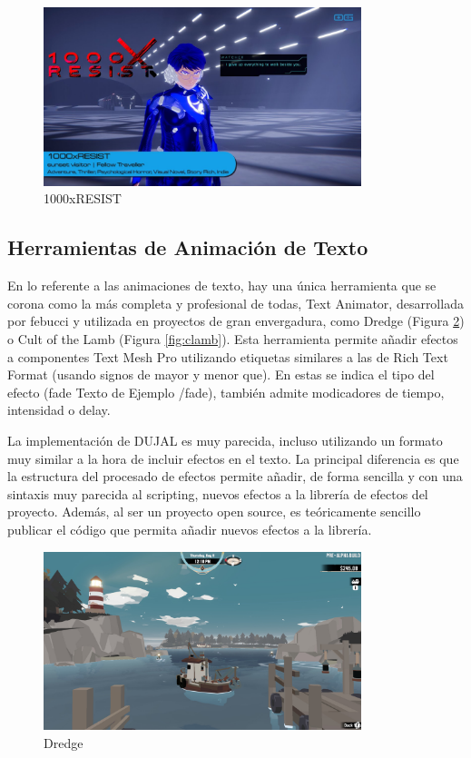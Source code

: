 \begin{figure}[H]
  \centering
  \includegraphics[width=350px,clip=true]{100xresist.png}
  \caption{1000xRESIST}
  \label{fig:1000xResist}
\end{figure}

 \subsection{Herramientas de Animación de Texto}
En lo referente a las animaciones de texto, hay una única herramienta que se corona como la más completa y profesional de todas, Text Animator\cite{TextAnimator}, desarrollada por febucci y utilizada en proyectos
 de gran envergadura, como Dredge (Figura \ref{fig:dredge}) o Cult of the Lamb (Figura \ref{fig:clamb}). Esta herramienta permite añadir efectos a componentes Text Mesh Pro utilizando etiquetas similares a las de 
 Rich Text Format (usando signos de mayor y menor que). En estas se indica el tipo del efecto (fade Texto de Ejemplo /fade), también admite modicadores de tiempo, intensidad o delay.
 
 La implementación de DUJAL es muy parecida, incluso utilizando 
 un formato muy similar a la hora de incluir efectos en el texto. La principal diferencia es que la estructura del procesado de efectos permite añadir, de forma sencilla y con una sintaxis muy parecida al scripting, 
 nuevos efectos a la librería de efectos del proyecto. Además, al ser un proyecto open source, es teóricamente sencillo publicar el código que permita añadir nuevos efectos a la librería.

\begin{figure}[H]
  \centering
  \includegraphics[width=350px,clip=true]{dredge.png}
  \caption{Dredge}
  \label{fig:dredge}
\end{figure}


